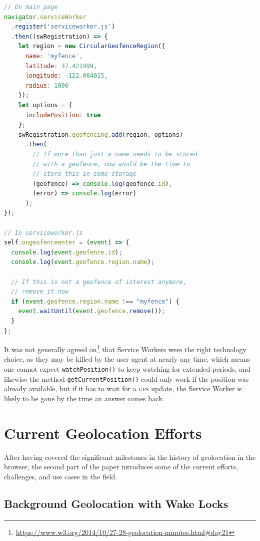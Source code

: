 \documentclass[sigconf,hyphens]{acmart}
\begin{document}
\begin{lstlisting}[caption={Geofencing \textsc{api} (conceived example)},
  label=code:geofence, language=JavaScript, float=h] 
// On main page
navigator.serviceWorker
  .register('serviceworker.js')
  .then((swRegistration) => {
    let region = new CircularGeofenceRegion({
      name: 'myfence',
      latitude: 37.421999,
      longitude: -122.084015,
      radius: 1000
    });
    let options = {
      includePosition: true
    };
    swRegistration.geofencing.add(region, options)
      .then(
        // If more than just a name needs to be stored
        // with a geofence, now would be the time to
        // store this in some storage
        (geofence) => console.log(geofence.id),
        (error) => console.log(error)
      );
});

// In serviceworker.js
self.ongeofenceenter = (event) => {
  console.log(event.geofence.id);
  console.log(event.geofence.region.name);

  // If this is not a geofence of interest anymore,
  // remove it now
  if (event.geofence.region.name !== "myfence") {
    event.waitUntil(event.geofence.remove());
  }
};
\end{lstlisting}

It was not generally agreed on\footnote{\url{https://www.w3.org/2014/10/27-28-geolocation-minutes.html\#day21}}
that Service Workers were the right technology choice,
as they may be killed by the user agent at nearly any time,
which means one cannot expect \texttt{watchPosition()} to keep watching for extended periods,
and likewise the method \texttt{getCurrentPosition()} could only work if the position was already available,
but if it has to wait for a \textsc{gps} update, the Service Worker is likely to be gone
by the time an answer comes back.

\section{Current Geolocation Efforts}

After having covered the significant milestones in the history of geolocation in the browser,
the second part of the paper introduces some of the current efforts, challenges,
and use cases in the field.

\subsection{Background Geolocation with Wake Locks}
\label{sec:wakelocks}
\end{document}
